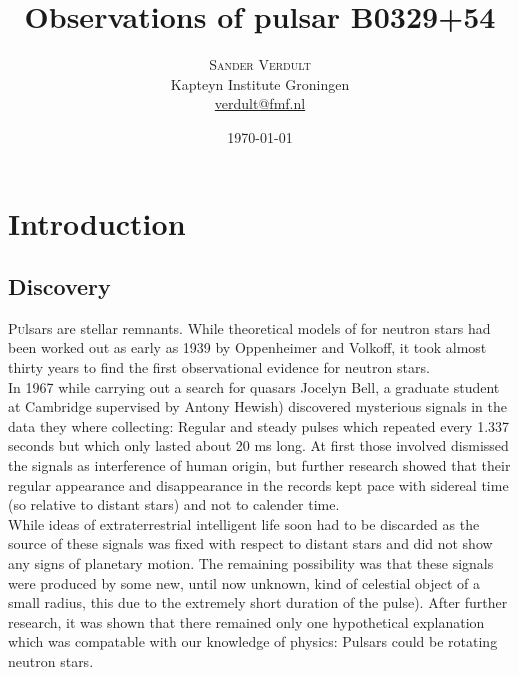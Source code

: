 \documentclass[twoside,twocolumn]{article}
\title{Observations of pulsar B0329+54} %
\author{%
	\textsc{Sander Verdult}\\%
	\normalsize Kapteyn Institute Groningen \\ %
	\normalsize \href{verdult@fmf.nl}{verdult@fmf.nl} %
}
\date{\today} %
\begin{document}
	
	\maketitle
	
	
	\section{Introduction}
	\subsection{Discovery}
	\lettrine[nindent=0em,lines=2]{P}ulsars are stellar remnants. While theoretical models of for neutron stars had been worked out as early as 1939 by Oppenheimer and Volkoff, it took almost thirty years to find the first observational evidence for neutron stars. \\
	In 1967 while carrying out a search for quasars Jocelyn Bell, a graduate student at Cambridge supervised by Antony Hewish) discovered mysterious signals in the data they where collecting: Regular and steady pulses which repeated every 1.337 seconds but which only lasted about 20 ms long. At first those involved dismissed the signals as interference of human origin, but further research showed that their regular appearance and disappearance in the records kept pace with sidereal time (so relative to distant stars) and not to calender time.\\
	While ideas of extraterrestrial intelligent life soon had to be discarded as the source of these signals was fixed with respect to distant stars and did not show any signs of planetary motion. The remaining possibility was that these signals were produced by some new, until now unknown, kind of celestial object of a small radius, this due to the extremely short duration of the pulse). After further research, it was shown that there remained only one hypothetical explanation which was compatable with our knowledge of physics: Pulsars could be rotating neutron stars.
	
\end{document}
